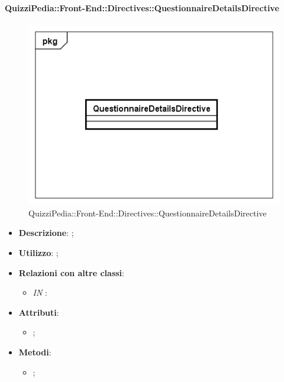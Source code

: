 \paragraph{QuizziPedia::Front-End::Directives::QuestionnaireDetailsDirective}

\label{QuizziPedia::Front-End::Directives::QuestionnaireDetailsDirective}

\begin{figure}[h]
	\centering
	\includegraphics[scale=0.5,keepaspectratio]{UML/Classi/Front-End/QuizziPedia_Front-end_Directives_QuestionnaireDetailsDirective.png}
	\caption{QuizziPedia::Front-End::Directives::QuestionnaireDetailsDirective}
\end{figure}

\begin{itemize}
	\item \textbf{Descrizione}: ;
	\item \textbf{Utilizzo}: ;
	\item \textbf{Relazioni con altre classi}: 
	\begin{itemize}
		\item \textit{IN} \texttt{}: 
	\end{itemize}
	\item \textbf{Attributi}: 
	\begin{itemize}
		\item ;
	\end{itemize}
	\item \textbf{Metodi}: 
	\begin{itemize}
		\item ;
	\end{itemize}
\end{itemize}

